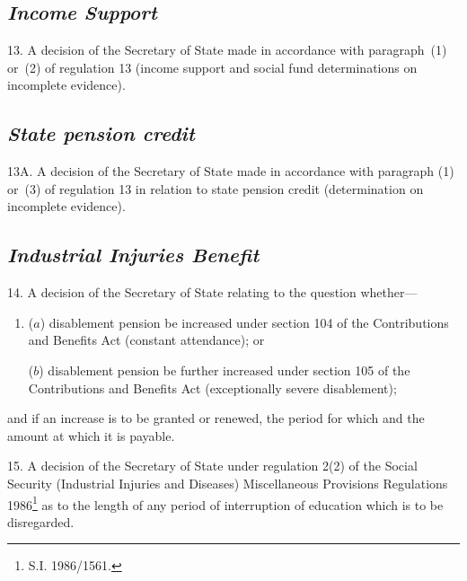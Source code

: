 \documentclass[12pt,a4paper]{article}
\begin{document}
\subsection*{\itshape Income Support}

13.  A decision of the Secretary of State 
made in accordance with paragraph~(1) or~(2) of regulation 13 (income support and social fund determinations on incomplete evidence).


\subsection*{\itshape State pension credit}

13A.  A decision of the Secretary of State made in accordance with paragraph (1) or~(3) of regulation 13 in relation to state pension credit (determination on incomplete evidence).


\subsection*{\itshape Industrial Injuries Benefit}

14.  A decision of the Secretary of State relating to the question whether—
\begin{enumerate}\item[]
($a$) disablement pension be increased under section 104 of the Contributions and Benefits Act (constant attendance); or

($b$) disablement pension be further increased under section 105 of the Contributions and Benefits Act (exceptionally severe disablement);
\end{enumerate}
and if an increase is to be granted or renewed, the period for which and the amount at which it is payable.

\medskip

15.  A decision of the Secretary of State under regulation 2(2) of the Social Security (Industrial Injuries and Diseases) Miscellaneous Provisions Regulations 1986\footnote{\frenchspacing S.I. 1986/1561.} as to the length of any period of interruption of education which is to be disregarded.
\end{document}
